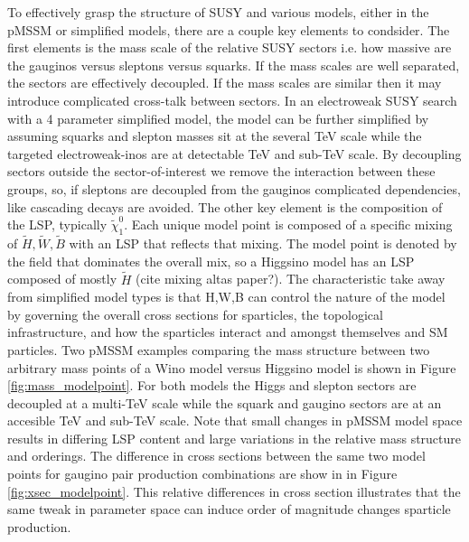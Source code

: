 To effectively grasp the structure of SUSY and various models, either in the pMSSM or simplified models, there are a couple key elements to condsider. The first elements is the mass scale of the relative SUSY sectors i.e. how massive are the gauginos versus sleptons versus squarks. If the mass scales are well separated, the sectors are effectively decoupled. If the mass scales are similar then it may introduce complicated cross-talk between sectors. In an electroweak SUSY search with a 4 parameter simplified model, the model can be further simplified by assuming squarks and slepton masses sit at the several TeV scale while the targeted electroweak-inos are at detectable  TeV and sub-TeV scale.  By decoupling sectors outside the sector-of-interest we remove the interaction between these groups, so, if sleptons are decoupled from the gauginos complicated dependencies, like cascading decays are avoided. The other key element is the composition of the LSP, typically $\tilde{\chi}^0_1$. Each unique model point is composed of a specific mixing of $\tilde{H},\tilde{W},\tilde{B}$ with an LSP that reflects that mixing. The model point is denoted by the field that dominates the overall mix, so a Higgsino model has an LSP composed of mostly $\tilde{H}$ (cite mixing altas paper?). The characteristic take away from simplified model types is that H,W,B  can control the nature of the model by governing the overall cross sections for sparticles, the topological infrastructure, and how the sparticles interact and amongst themselves and SM particles. Two pMSSM examples comparing the mass structure between two arbitrary mass points of a Wino model versus Higgsino model is shown in Figure \ref{fig:mass_modelpoint}. For both models the Higgs and slepton sectors are decoupled at a multi-TeV scale while the squark and gaugino sectors are at an accesible TeV and sub-TeV scale. Note that small changes in pMSSM model space results in differing LSP content and large variations in the relative mass structure and orderings. The difference in cross sections between the same two model points for gaugino pair production combinations are show in in Figure \ref{fig:xsec_modelpoint}. This relative differences in cross section illustrates that the same tweak in parameter space can induce order of magnitude changes sparticle production.





